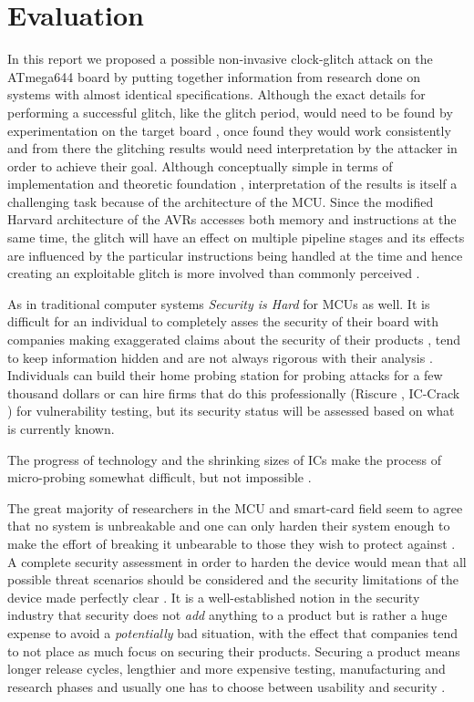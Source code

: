 \section{Evaluation}
\label{sec:conclusion}
In this report we proposed a possible non-invasive clock-glitch attack on the ATmega644 board by putting together information from research done on systems with almost identical specifications. Although the exact details for performing a successful glitch, like the glitch period, would need to be found by experimentation on the target board \citep{glitches_paper}, once found they would work consistently \citep{glitches_paper} and from there the glitching results would need interpretation by the attacker in order to achieve their goal. Although conceptually simple in terms of implementation and theoretic foundation \citep{sergei:thesis} \citep{glitches_paper}, interpretation of the results is itself a challenging task \citep{glitches_paper} because of the architecture of the MCU. Since the modified Harvard architecture of the AVRs accesses both memory and instructions at the same time, the glitch will have an effect on multiple pipeline stages and its effects are influenced by the particular instructions being handled at the time and hence creating an exploitable glitch is more involved than commonly perceived \citep{glitches_paper}.

As in traditional computer systems \emph{Security is Hard} for MCUs as well. It is difficult for an individual to completely asses the security of their board with companies making exaggerated claims about the security of their products \citep{sergei:thesis}, tend to keep information hidden and are not always rigorous with their analysis \citep{sergei:thesis}. Individuals can build their home probing station for probing attacks for a few thousand dollars \citep{sergei:thesis} \citep{low_cost_probing} or can hire firms that do this professionally (Riscure \citep{website:riscure}, {IC-Crack} \citep{atmel_mcu_crack}) for vulnerability testing, but its security status will be assessed based on what is currently known. 

The progress of technology and the shrinking sizes of ICs make the process of micro-probing somewhat difficult, but not impossible \citep{sergei:thesis}.

The great majority of researchers in the MCU and smart-card field seem to agree that no system is unbreakable and one can only harden their system enough to make the effort of breaking it unbearable to those they wish to protect against \citep{anderson:cautionary_note} \cite{sergei:thesis}. A complete security assessment in order to harden the device would mean that all possible threat scenarios should be considered and the security limitations of the device made perfectly clear \citep{kocher:DPA}. It is a well-established notion in the security industry that security does not \emph{add} anything to a product but is rather a huge expense to avoid a \emph{potentially} bad situation, with the effect that companies tend to not place as much focus on securing their products. Securing a product means longer release cycles, lengthier and more expensive testing, manufacturing and research phases \citep{kocher:DPA} and usually one has to choose between usability and security \citep{sergei:thesis}.